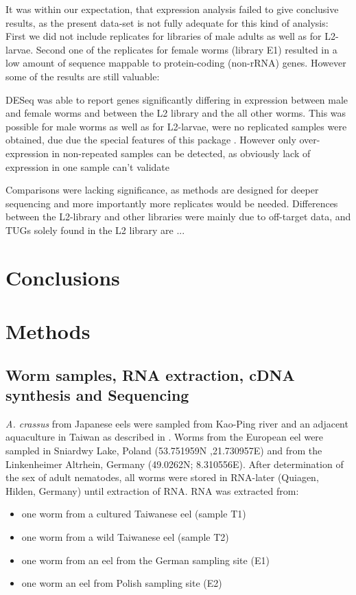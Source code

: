 \documentclass[10pt]{bmc_article}
\newenvironment{bmcformat}{\begin{raggedright}\baselineskip20pt\sloppy\setboolean{publ}{false}}{\end{raggedright}\baselineskip20pt\sloppy}
\begin{document}
\begin{bmcformat}
It was within our expectation, that expression analysis failed to give
conclusive results, as the present data-set is not fully adequate for
this kind of analysis: First we did not include replicates for
libraries of male adults as well as for L2-larvae. Second one of the
replicates for female worms (library E1) resulted in a low amount of
sequence mappable to protein-coding (non-rRNA) genes.
However some of the results are still valuable:

DESeq was able to report genes significantly differing in expression
between male and female worms and between the L2 library and the all
other worms. This was possible for male worms as well as for
L2-larvae, were no replicated samples were obtained, due due the
special features of this package \cite{pmid20979621}. However only
over-expression in non-repeated samples can be detected, as obviously
lack of expression in one sample can't validate

Comparisons were lacking significance, as methods are designed for
deeper sequencing and more importantly more replicates would be
needed. Differences between the L2-library and other libraries were
mainly due to off-target data, and TUGs solely found in the L2 library
are ... 



\section*{Conclusions}

  
\section*{Methods}
\subsection*{Worm samples, RNA extraction, cDNA synthesis and
  Sequencing}
\textit{A. crassus} from Japanese eels were sampled from Kao-Ping river
and an adjacent aquaculture in Taiwan as described in
\cite{heitlinger_massive_2009}. Worms from the European eel were
sampled in Sniardwy Lake, Poland (53.751959N ,21.730957E) and from the
Linkenheimer Altrhein, Germany (49.0262N; 8.310556E). After
determination of the sex of adult nematodes, all worms were stored in
RNA-later (Quiagen, Hilden, Germany) until extraction of RNA. RNA was
extracted from:

\begin{itemize}
\item one worm from a  cultured Taiwanese eel (sample T1)
\item one worm from a wild Taiwanese eel (sample T2)
\item one worm from an eel from the German sampling site (E1)
\item one worm an eel from Polish sampling site (E2)
\end{itemize}


\end{bmcformat}
\end{document}
